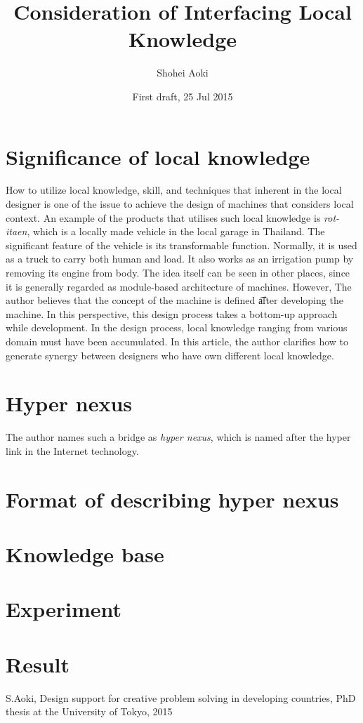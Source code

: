 \documentclass[]{article}
\begin{document}
\author{Shohei Aoki}
\title{Consideration of Interfacing Local Knowledge}
\date{First draft, 25 Jul 2015}  
\maketitle

\section{Significance of local knowledge}
How to utilize local knowledge, skill, and techniques that inherent in the local designer is one of the issue to achieve the design of machines that considers local context. 
An example of the products that utilises such local knowledge is {\it rot-itaen}, which is a locally made vehicle in the local garage in Thailand.
The significant feature of the vehicle is its transformable function.
Normally, it is used as a truck to carry both human and load. It also works as an irrigation pump by removing its engine from body.  
The idea itself can be seen in other places, since it is generally regarded as module-based architecture of machines. 
However, The author believes that the concept of the machine is defined {\t after} developing the machine. 
In this perspective, this design process takes a bottom-up approach while development.
In the design process, local knowledge ranging from various domain must have been accumulated.
In this article, the author clarifies how to generate synergy between designers who have own different local knowledge. 

\section{Hyper nexus}
The author names such a bridge as {\it hyper nexus}, which is named after the hyper link in the Internet technology.

\section{Format of describing hyper nexus}

\section{Knowledge base}

\section{Experiment}


\section{Result}


\begin{thebibliography}{99}
\item S.Aoki, Design support for creative problem solving in developing countries, PhD thesis at the University of Tokyo, 2015
\end{thebibliography}
\end{document}
